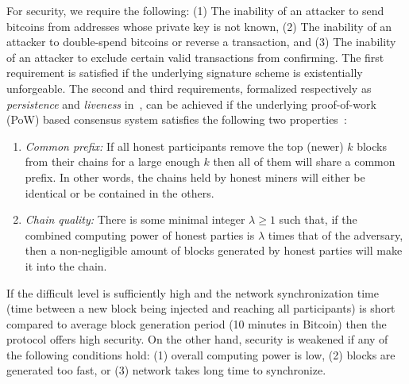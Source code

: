 \documentclass[]{report}   %
\begin{document}
For security, we require the following: (1) The inability of an attacker to send bitcoins from addresses whose private key is not known, (2) The inability of an attacker to double-spend bitcoins or reverse a transaction, and (3) The inability of an attacker to exclude certain valid transactions from confirming. The first requirement is satisfied if the underlying signature scheme is existentially unforgeable. The second and third requirements, formalized respectively as {\em persistence} and {\em liveness} in~\cite{Garay2015}, can be achieved if the underlying proof-of-work (PoW) based consensus system satisfies the following two properties~\cite{Garay2015}:
\begin{enumerate}
	\item {\em Common prefix:} If all honest participants remove the top (newer) $k$ blocks from their chains for a large enough $k$ then all of them will share a common prefix. In other words, the chains held by honest miners will either be identical or be contained in the others.
	\item {\em Chain quality:} There is some minimal integer $\lambda\geq 1$ such that, if the combined computing power of honest parties is $\lambda$ times that of the adversary, then a non-negligible amount of blocks generated by honest parties will make it into the chain. 
\end{enumerate}

If the difficult level is sufficiently high and the network synchronization time (time between a new block being injected and reaching all participants) is short compared to average block generation period (10 minutes in Bitcoin) then the protocol offers high security. On the other hand, security is weakened if any of the following conditions hold:
(1) overall computing power is low, (2) blocks are generated too fast, or (3) network takes long time to synchronize. 
\end{document}
